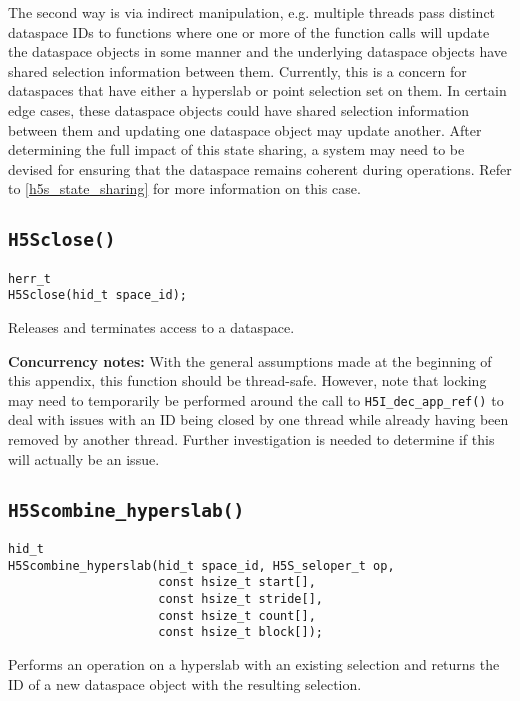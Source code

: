 \documentclass[../HDF5_RFC.tex]{subfiles}
\begin{document}
The second way is via indirect manipulation, e.g. multiple threads pass distinct dataspace IDs
to functions where one or more of the function calls will update the dataspace objects in some
manner and the underlying dataspace objects have shared selection information between them.
Currently, this is a concern for dataspaces that have either a hyperslab or point selection set
on them. In certain edge cases, these dataspace objects could have shared selection information
between them and updating one dataspace object may update another. After determining the full
impact of this state sharing, a system may need to be devised for ensuring that the dataspace
remains coherent during operations. Refer to \ref{h5s_state_sharing} for more information on
this case.

\subsection{\texttt{H5Sclose()}}
\label{apdx:h5s_func_h5sclose}

\begin{verbatim}
herr_t
H5Sclose(hid_t space_id);
\end{verbatim}

Releases and terminates access to a dataspace.

\textbf{Concurrency notes:} With the general assumptions made at the beginning of this
appendix, this function should be thread-safe. However, note that locking may need to
temporarily be performed around the call to \texttt{H5I\_dec\_app\_ref()} to deal with
issues with an ID being closed by one thread while already having been removed by another
thread. Further investigation is needed to determine if this will actually be an issue.

\subsection{\texttt{H5Scombine\_hyperslab()}}
\label{apdx:h5s_func_h5scombine_hyperslab}

\begin{verbatim}
hid_t
H5Scombine_hyperslab(hid_t space_id, H5S_seloper_t op,
                     const hsize_t start[],
                     const hsize_t stride[],
                     const hsize_t count[],
                     const hsize_t block[]);
\end{verbatim}

Performs an operation on a hyperslab with an existing selection and returns the ID of a
new dataspace object with the resulting selection.
\end{document}
